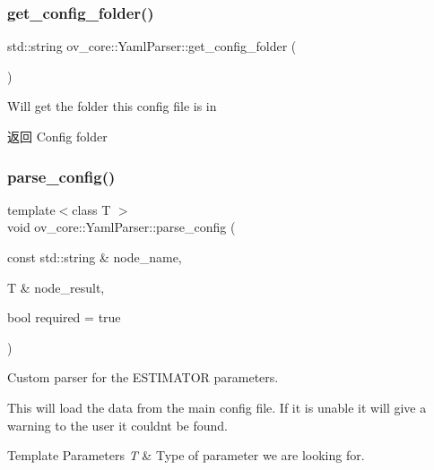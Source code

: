 \subsubsection{\texorpdfstring{get\+\_\+config\+\_\+folder()}{get\_config\_folder()}}
{\footnotesize\ttfamily std\+::string ov\+\_\+core\+::\+Yaml\+Parser\+::get\+\_\+config\+\_\+folder (\begin{DoxyParamCaption}{ }\end{DoxyParamCaption})\hspace{0.3cm}{\ttfamily [inline]}}



Will get the folder this config file is in 

\begin{DoxyReturn}{返回}
Config folder 
\end{DoxyReturn}
\mbox{\label{classov__core_1_1YamlParser_aff9bc745ae8097ece9807ec4d0fbec2f}} 
\subsubsection{\texorpdfstring{parse\+\_\+config()}{parse\_config()}}
{\footnotesize\ttfamily template$<$class T $>$ \\
void ov\+\_\+core\+::\+Yaml\+Parser\+::parse\+\_\+config (\begin{DoxyParamCaption}\item[{const std\+::string \&}]{node\+\_\+name,  }\item[{T \&}]{node\+\_\+result,  }\item[{bool}]{required = {\ttfamily true} }\end{DoxyParamCaption})\hspace{0.3cm}{\ttfamily [inline]}}



Custom parser for the E\+S\+T\+I\+M\+A\+T\+OR parameters. 

This will load the data from the main config file. If it is unable it will give a warning to the user it couldn\textquotesingle{}t be found.


\begin{DoxyTemplParams}{Template Parameters}
{\em T} & Type of parameter we are looking for. \\
\hline
\end{DoxyTemplParams}


